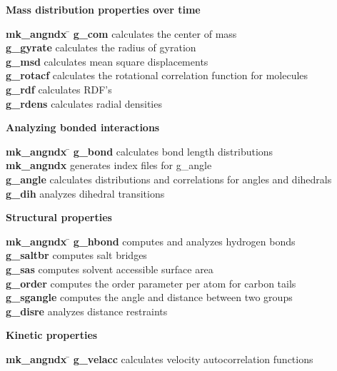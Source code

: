 \begin{description}
\item {\large\bf Mass distribution properties over time}
\begin{tabbing}
{\bf mk\_angndx} \= \kill
{\bf g\_com} \> calculates the center of mass \\
{\bf g\_gyrate} \> calculates the radius of gyration \\
{\bf g\_msd} \> calculates mean square displacements \\
{\bf g\_rotacf} \> calculates the rotational correlation function for molecules \\
{\bf g\_rdf} \> calculates RDF's \\
{\bf g\_rdens} \> calculates radial densities \\
\end{tabbing}

\item {\large\bf Analyzing bonded interactions}
\begin{tabbing}
{\bf mk\_angndx} \= \kill
{\bf g\_bond} \> calculates bond length distributions \\
{\bf mk\_angndx} \> generates index files for g\_angle \\
{\bf g\_angle} \> calculates distributions and correlations for angles and dihedrals \\
{\bf g\_dih} \> analyzes dihedral transitions \\
\end{tabbing}

\item {\large\bf Structural properties}
\begin{tabbing}
{\bf mk\_angndx} \= \kill
{\bf g\_hbond} \> computes and analyzes hydrogen bonds \\
{\bf g\_saltbr} \> computes salt bridges \\
{\bf g\_sas} \> computes solvent accessible surface area \\
{\bf g\_order} \> computes the order parameter per atom for carbon tails \\
{\bf g\_sgangle} \> computes the angle and distance between two groups \\
{\bf g\_disre} \> analyzes distance restraints \\
\end{tabbing}

\item {\large\bf Kinetic properties}
\begin{tabbing}
{\bf mk\_angndx} \= \kill
{\bf g\_velacc} \> calculates velocity autocorrelation functions \\
\end{tabbing}


\end{description}
